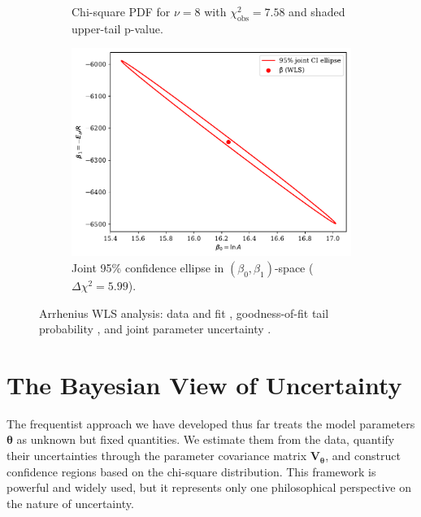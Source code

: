 \begin{exampleBox}
\begin{figure}[H]
\begin{subfigure}[t]{0.32\textwidth}
          \caption{Chi-square PDF for \(\nu=8\) with \(\chi^2_\text{obs}=7.58\) and shaded upper-tail p-value.}
          \label{subfig:chi2-tail}
        \end{subfigure}
        \hfill
        \begin{subfigure}[t]{0.32\textwidth}
          \centering
          \includegraphics[width=\linewidth]{figs/models-vs-data/beta_joint_ellipse.pdf}
          \caption{Joint 95\% confidence ellipse in \((\beta_0,\beta_1)\)-space (\(\Delta\chi^2=5.99\)).}
          \label{subfig:beta-ellipse}
        \end{subfigure}
      
        \caption{Arrhenius WLS analysis: data and fit , goodness-of-fit tail probability , and joint parameter uncertainty .}
        \label{fig:arrhenius-example}
    \end{figure}
\end{exampleBox}

\section{The Bayesian View of Uncertainty}

The frequentist approach we have developed thus far treats the model parameters $\boldsymbol{\theta}$ as unknown but fixed quantities. We estimate them from the data, quantify their uncertainties through the parameter covariance matrix $\mathbf{V}_{\boldsymbol{\theta}}$, and construct confidence regions based on the chi-square distribution. This framework is powerful and widely used, but it represents only one philosophical perspective on the nature of uncertainty.

